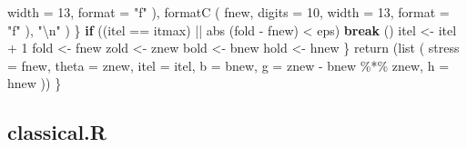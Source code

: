 \documentclass[
  12pt,
  letterpaper,
  DIV=11,
  numbers=noendperiod]{scrreprt}
\newenvironment{Shaded}{\begin{snugshade}}{\end{snugshade}}
\newcommand{\AttributeTok}[1]{\textcolor[rgb]{0.40,0.45,0.13}{#1}}
\newcommand{\ControlFlowTok}[1]{\textcolor[rgb]{0.00,0.23,0.31}{\textbf{#1}}}
\newcommand{\DecValTok}[1]{\textcolor[rgb]{0.68,0.00,0.00}{#1}}
\newcommand{\FunctionTok}[1]{\textcolor[rgb]{0.28,0.35,0.67}{#1}}
\newcommand{\NormalTok}[1]{\textcolor[rgb]{0.00,0.23,0.31}{#1}}
\newcommand{\OtherTok}[1]{\textcolor[rgb]{0.00,0.23,0.31}{#1}}
\newcommand{\SpecialCharTok}[1]{\textcolor[rgb]{0.37,0.37,0.37}{#1}}
\newcommand{\StringTok}[1]{\textcolor[rgb]{0.13,0.47,0.30}{#1}}
\theoremstyle{remark}
\begin{document}
\begin{Shaded}
\begin{Highlighting}[]
            \AttributeTok{width =} \DecValTok{13}\NormalTok{,}
            \AttributeTok{format =} \StringTok{"f"}
\NormalTok{          ),}
          \FunctionTok{formatC}\NormalTok{ (}
\NormalTok{            fnew,}
            \AttributeTok{digits =} \DecValTok{10}\NormalTok{,}
            \AttributeTok{width =} \DecValTok{13}\NormalTok{,}
            \AttributeTok{format =} \StringTok{"f"}
\NormalTok{          ),}
          \StringTok{"}\SpecialCharTok{\textbackslash{}n}\StringTok{"}
\NormalTok{        )}
\NormalTok{      \}}
      \ControlFlowTok{if}\NormalTok{ ((itel }\SpecialCharTok{==}\NormalTok{ itmax) }\SpecialCharTok{||} \FunctionTok{abs}\NormalTok{ (fold }\SpecialCharTok{{-}}\NormalTok{ fnew) }\SpecialCharTok{\textless{}}\NormalTok{ eps)}
        \ControlFlowTok{break}\NormalTok{ ()}
\NormalTok{      itel }\OtherTok{\textless{}{-}}\NormalTok{ itel }\SpecialCharTok{+} \DecValTok{1}
\NormalTok{      fold }\OtherTok{\textless{}{-}}\NormalTok{ fnew}
\NormalTok{      zold }\OtherTok{\textless{}{-}}\NormalTok{ znew}
\NormalTok{      bold }\OtherTok{\textless{}{-}}\NormalTok{ bnew}
\NormalTok{      hold }\OtherTok{\textless{}{-}}\NormalTok{ hnew}
\NormalTok{    \}}
    \FunctionTok{return}\NormalTok{ (}\FunctionTok{list}\NormalTok{ (}
      \AttributeTok{stress =}\NormalTok{ fnew,}
      \AttributeTok{theta =}\NormalTok{ znew,}
      \AttributeTok{itel =}\NormalTok{ itel,}
      \AttributeTok{b =}\NormalTok{ bnew,}
      \AttributeTok{g =}\NormalTok{ znew }\SpecialCharTok{{-}}\NormalTok{ bnew }\SpecialCharTok{\%*\%}\NormalTok{ znew,}
      \AttributeTok{h =}\NormalTok{ hnew}
\NormalTok{    ))}
\NormalTok{  \}}
\end{Highlighting}
\end{Shaded}

\subsection*{classical.R}\label{apcodeclass}
\end{document}
